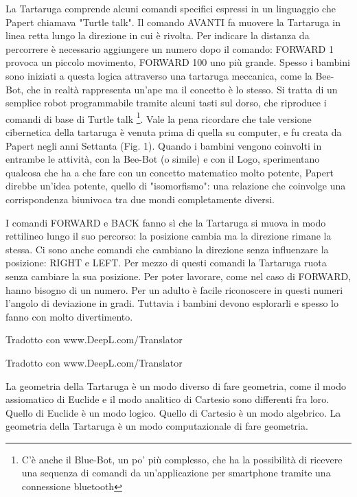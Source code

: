 La Tartaruga comprende alcuni comandi specifici espressi in un linguaggio che Papert chiamava "Turtle talk". Il comando AVANTI fa muovere la Tartaruga in linea retta lungo la direzione in cui è rivolta. Per indicare la distanza da percorrere è necessario aggiungere un numero dopo il comando: FORWARD 1 provoca un piccolo movimento, FORWARD 100 uno più grande. Spesso i bambini sono iniziati a questa logica attraverso una tartaruga meccanica, come la Bee-Bot, che in realtà rappresenta un'ape ma il concetto è lo stesso. Si tratta di un semplice robot programmabile tramite alcuni tasti sul dorso, che riproduce i comandi di base di Turtle talk \footnote{C'è anche il Blue-Bot, un po' più complesso, che ha la possibilità di ricevere una sequenza di comandi da un'applicazione per smartphone tramite una connessione bluetooth}. Vale la pena ricordare che tale versione cibernetica della tartaruga è venuta prima di quella su computer, e fu creata da Papert negli anni Settanta (Fig. 1). Quando i bambini vengono coinvolti in entrambe le attività, con la Bee-Bot (o simile) e con il Logo, sperimentano qualcosa che ha a che fare con un concetto matematico molto potente, Papert direbbe un'idea potente, quello di "isomorfismo": una relazione che coinvolge una corrispondenza biunivoca tra due mondi completamente diversi.

I comandi FORWARD e BACK fanno sì che la Tartaruga si muova in modo rettilineo lungo il suo percorso: la posizione cambia ma la direzione rimane la stessa. Ci sono anche comandi che cambiano la direzione senza influenzare la posizione: RIGHT e LEFT. Per mezzo di questi comandi la Tartaruga ruota senza cambiare la sua posizione. Per poter lavorare, come nel caso di FORWARD, hanno bisogno di un numero. Per un adulto è facile riconoscere in questi numeri l'angolo di deviazione in gradi. Tuttavia i bambini devono esplorarli e spesso lo fanno con molto divertimento.


Tradotto con www.DeepL.com/Translator

Tradotto con www.DeepL.com/Translator


La geometria della Tartaruga è un modo diverso di fare geometria, come il modo assiomatico di Euclide e il modo analitico di Cartesio sono differenti fra loro. Quello di Euclide è un modo logico. Quello di Cartesio è un modo algebrico. La geometria della Tartaruga è un modo computazionale di fare geometria.

